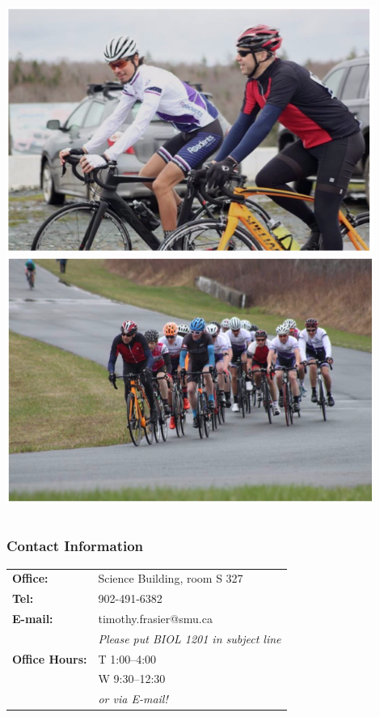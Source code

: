 \documentclass[10pt]{beamer}
\begin{document}
\begin{frame}
\begin{columns}
		\begin{column}{0.4\textwidth}
			\includegraphics[width=0.9\textwidth]{figures/cycling1.png}\\
			\vspace{0.5cm}
			\includegraphics[width=0.9\textwidth]{figures/cycling2.png}\\
		\end{column}
	\end{columns}
\end{frame}


\begin{frame}[t]
\frametitle{Contact Information}
\vspace{0.5cm}

	\begin{tabular}{@{} l l}
		\textbf{Office:} & Science Building, room S 327\\
		\addlinespace
		\addlinespace
		\textbf{Tel:} & 902-491-6382\\
		\addlinespace
		\addlinespace
		\textbf{E-mail:} & timothy.frasier@smu.ca\\
				& \textcolor{myblue2}{\emph{Please put BIOL 1201 in subject line}}\\
		\addlinespace
		\addlinespace
		\textbf{Office Hours:} & T 1:00--4:00 \\
			& W 9:30--12:30\\
			& \textcolor{myblue2}{\emph{or via E-mail!}}\\
		
	\end{tabular}
\end{frame}
\end{document}
